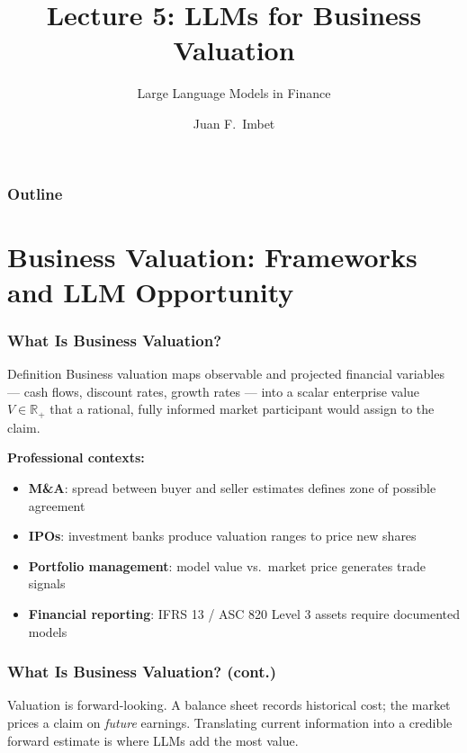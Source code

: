 \documentclass[9pt,t]{beamer}
\title{Lecture 5: LLMs for Business Valuation}
\subtitle{Large Language Models in Finance}
\author{Juan F.\ Imbet}
\institute{Paris Dauphine -- PSL University}
\date{}
\begin{document}
\begin{frame}
\frametitle{}
\titlepage
\end{frame}

\begin{frame}
\frametitle{Outline}
\tableofcontents
\end{frame}

\section{Business Valuation: Frameworks and LLM Opportunity}

\begin{frame}
\frametitle{What Is Business Valuation?}

\begin{block}{Definition}
  Business valuation maps observable and projected financial variables --- cash flows,
  discount rates, growth rates --- into a scalar enterprise value $V \in \mathbb{R}_+$
  that a rational, fully informed market participant would assign to the claim.
\end{block}

\smallskip
\textbf{Professional contexts:}
{\small
\begin{itemize}\itemsep0pt
  \item \textbf{M\&A}: spread between buyer and seller estimates defines zone of possible agreement
  \item \textbf{IPOs}: investment banks produce valuation ranges to price new shares
  \item \textbf{Portfolio management}: model value vs.\ market price generates trade signals
  \item \textbf{Financial reporting}: IFRS 13 / ASC 820 Level 3 assets require documented models
\end{itemize}}
\end{frame}

\begin{frame}
\frametitle{What Is Business Valuation? (cont.)}

\begin{bigpicture}
  Valuation is forward-looking. A balance sheet records historical cost;
  the market prices a claim on \emph{future} earnings.
  Translating current information into a credible forward estimate is where LLMs add the most value.
\end{bigpicture}
\end{frame}
\end{document}
